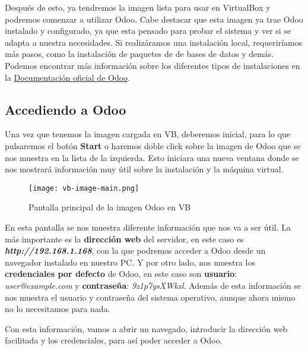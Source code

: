 Después de esto, ya tendremos la imagen lista para usar en VirtualBox y podremos comenzar a utilizar Odoo. Cabe destacar que esta imagen ya trae Odoo instalado y configurado, ya que esta pensado para probar el sistema y ver si se adapta a nuestra necesidades. Si realizáramos una instalación local, requeriríamos más pasos, como la instalación de paquetes de de bases de datos y demás. Podemos encontrar más información sobre los diferentes tipos de instalaciones en la \href{https://www.odoo.com/documentation/15.0/administration/install/install.html}{Documentación oficial de Odoo}.

\subsection{Accediendo a Odoo}
Una vez que tenemos la imagen cargada en VB, deberemos inicial, para lo que pulsaremos el botón \textbf{\textbf{Start}} o haremos doble click sobre la imagen de Odoo que se nos muestra en la lista de la izquierda. Esto iniciara una nueva ventana donde se nos mostrará información muy útil sobre la instalación y la máquina virtual.

\begin{figure}[h]
    \centering
    \texttt{[image: vb-image-main.png]}
    \caption{Pantalla principal de la imagen Odoo en VB}
\end{figure}

En esta pantalla se nos muestra diferente información que nos va a ser útil. La más importante es la\textbf{ dirección web} del servidor, en este caso es \textbf{\textit{http://192.168.1.168}}, con la que podremos acceder a Odoo desde un navegador instalado en nuestro PC. Y por otro lado, nos muestra los \textbf{credenciales por defecto} de Odoo, en este caso son \textbf{usuario}: \textit{user@example.com} y \textbf{contraseña}: \textit{9z1p7ysXWkxl}. Además de esta información se nos muestra el usuario y contraseña del sistema operativo, aunque ahora mismo no lo necesitamos para nada.

Con esta información, vamos a abrir un navegado, introducir la dirección web facilitada y los credenciales, para así poder acceder a Odoo.


\newpage



